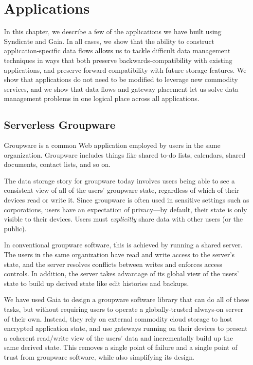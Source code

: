 \chapter{Applications}
\label{chap:applications}

In this chapter, we describe a few of the applications we have built using
Syndicate and Gaia.  In all cases, we show that the ability to construct
application-specific data flows allows us to tackle difficult data management
techniques in ways that both preserve backwards-compatibility with existing
applications, and preserve forward-compatibility with future storage features.
We show that applications do not need to be modified to leverage
new commodity services, and we show that data flows and gateway placement let us
solve data management problems in one logical place across all applications.

\section{Serverless Groupware}

Groupware is a common Web application employed by users in the same
organization.  Groupware includes things like shared to-do lists, calendars,
shared documents, contact lists, and so on.

The data storage story for groupware today involves users being able to see a
consistent view of all of the users' groupware state, regardless of which
of their devices read or write it.  Since groupware is often used in sensitive
settings such as corporations, users have an expectation of privacy---by
default, their state is only visible to their devices.  Users must
\emph{explicitly} share data with other users (or the public).

In conventional groupware software, this is achieved by running a shared server.
The users in the same organization have read and write access to the server's
state, and the server resolves conflicts between writes and enforces access
controls.  In addition, the server takes advantage of its global view of the
users' state to build up derived state like edit histories and
backups.

We have used Gaia to design a groupware software library that can do all of these tasks,
but without requiring users to operate a globally-trusted always-on server of
their own.  Instead, they rely on external commodity cloud storage to host
encrypted application state, and use gateways running on their devices to
present a coherent read/write view of the users' data and incrementally build up
the same derived state.  This removes a single point of failure and a single
point of trust from groupware software, while also simplifying its design.

